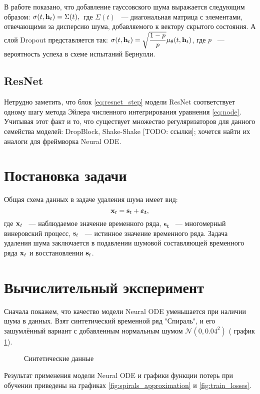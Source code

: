 \documentclass[a4paper, 14pt]{article}
\begin{document}
	В работе \cite{Liu2019} показано, что добавление гауссовского шума выражается следующим образом: $\sigma(t, \mathbf{h}_t) = \Sigma(t), \:$ где $\Sigma(t)$ ~--- диагональная матрица с элементами, отвечающими за дисперсию шума, добавляемого к вектору скрытого состояния.
	А слой Dropout представляется так: $\sigma(t, \mathbf{h}_t) = \sqrt{\dfrac{1 - p}{p}} \mu_\theta(t, \mathbf{h}_t)$, где $p$ ~--- вероятность успеха в схеме испытаний Бернулли. 
	
	\subsection{ResNet}
	Нетрудно заметить, что блок \ref{eq:resnet_step} модели ResNet соответствует одному шагу метода Эйлера численного интегрирования уравнения \ref{eq:node}.
	Учитывая этот факт и то, что существует множество регуляризаторов для данного семейства моделей: DropBlock, Shake-Shake [TODO: ссылки]; хочется найти их аналоги для фреймворка Neural ODE.
	
	\section{Постановка задачи}
	Общая схема данных в задаче удаления шума имеет вид:  
	$$\mathbf{x}_t = \mathbf{s}_t + \boldsymbol{\varepsilon_t},$$
	где $\mathbf{x}_t$ ~--- наблюдаемое значение временного ряда, $\boldsymbol{\epsilon_t}$ ~--- многомерный винеровский процесс, $\mathbf{s}_t$ ~--- истинное значение временного ряда.
	Задача удаления шума заключается в подавлении шумовой составляющей временного ряда $\mathbf{x}_t$ и восстановлении $\mathbf{s}_t$.
	
	\section{Вычислительный эксперимент}
	Сначала покажем, что качество модели Neural ODE уменьшается при наличии шума в данных.
	Взят синтетический временной ряд "Спираль", и его зашумлённый вариант с добавленным нормальным шумом $\mathcal{N}(0, 0.04^2)$ ( график \ref{fig:spirals}).
	
	\begin{figure}[bhtp]
		\centering
		\caption{Синтетические данные}
		\label{fig:spirals}
	\end{figure}

	Результат применения модели Neural ODE и графики функции потерь при обучении приведены на графиках \ref{fig:spirals_approximation} и \ref{fig:train_losses}.
	
\end{document}
